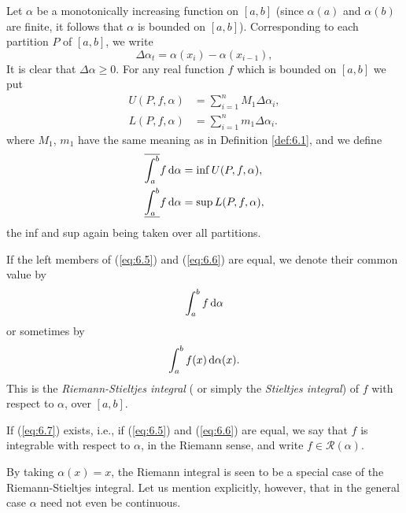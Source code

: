 \begin{mydef}
    \label{def:6.2}
    Let $\alpha$ be a monotonically increasing function on $[a, b]$ 
    (since $\alpha (a)$ and $\alpha (b)$ are finite, 
    it follows that $\alpha$ is bounded on $[a, b]$). 
    Corresponding to each partition $P$ of $[a, b]$, 
    we write
    \begin{equation*}
        \Delta \alpha_t = \alpha (x_{i}) - \alpha (x_{i-1}),        
    \end{equation*}
    It is clear that $\Delta \alpha \geq 0$. 
    For any real function $f$ which is bounded on $[a, b]$
    we put
    \begin{align*}
        U(P, f, \alpha) &= \sum_{i=1}^{n} M_1 \Delta \alpha_i, \\
        L(P, f, \alpha) &= \sum_{i=1}^{n} m_1 \Delta \alpha_i. 
    \end{align*}
    where $M_1$, $m_1$ have the same meaning as in Definition \ref{def:6.1}, 
    and we define
    \begin{align}
        \label{eq:6.5}
        \overline{\int_{a}^{b}} f \d \alpha &= \inf U(P, f, \alpha), \\
        \label{eq:6.6}
        \underline{\int_{a}^{b}} f \d \alpha &= \sup L(P, f, \alpha),
    \end{align}
    the inf and sup again being taken over all partitions.

    If the left members of (\ref{eq:6.5}) and (\ref{eq:6.6}) are equal, 
    we denote their common value by
    \begin{equation}
        \label{eq:6.7}
        \int_{a}^{b} f \d \alpha
    \end{equation}
    or sometimes by 
    \begin{equation}
        \label{eq:6.8}
        \int_{a}^{b} f(x) \d \alpha (x).
    \end{equation}
    This is the \emph{Riemann-Stieltjes integral} 
    ( or simply the \emph{Stieltjes integral}) of $f$ 
    with respect to $\alpha$, over $[a, b]$.

    If (\ref{eq:6.7}) exists, i.e., 
    if (\ref{eq:6.5}) and (\ref{eq:6.6}) are equal, 
    we say that $f$ is integrable with respect to $\alpha$, 
    in the Riemann sense, and write $f \in \mathscr{R}(\alpha)$.
    
    By taking $\alpha(x) = x$, 
    the Riemann integral is seen to be a special case of
    the Riemann-Stieltjes integral. 
    Let us mention explicitly, however, that in the
    general case $\alpha$ need not even be continuous.


\end{mydef}
